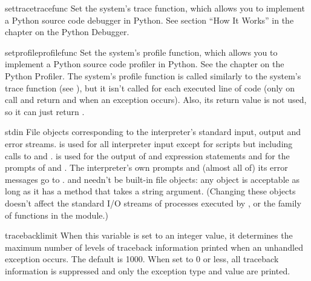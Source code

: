 \begin{funcdesc}{settrace}{tracefunc}
  Set the system's trace function, which allows you to implement a
  Python source code debugger in Python.  See section ``How It Works''
  in the chapter on the Python Debugger.
\end{funcdesc}

\begin{funcdesc}{setprofile}{profilefunc}
  Set the system's profile function, which allows you to implement a
  Python source code profiler in Python.  See the chapter on the
  Python Profiler.  The system's profile function
  is called similarly to the system's trace function (see
  ), but it isn't called for each executed line of
  code (only on call and return and when an exception occurs).  Also,
  its return value is not used, so it can just return .
\end{funcdesc}

\begin{datadesc}{stdin}
  File objects corresponding to the interpreter's standard input,
  output and error streams.   is used for all
  interpreter input except for scripts but including calls to
   and .   is used
  for the output of  and expression statements and for the
  prompts of  and .  The interpreter's
  own prompts and (almost all of) its error messages go to
  .   and  needn't
  be built-in file objects: any object is acceptable as long as it has
  a  method that takes a string argument.  (Changing these
  objects doesn't affect the standard I/O streams of processes
  executed by ,  or the 
  family of functions in the  module.)
\end{datadesc}

\begin{datadesc}{tracebacklimit}
When this variable is set to an integer value, it determines the
maximum number of levels of traceback information printed when an
unhandled exception occurs.  The default is 1000.  When set to 0 or
less, all traceback information is suppressed and only the exception
type and value are printed.
\end{datadesc}
